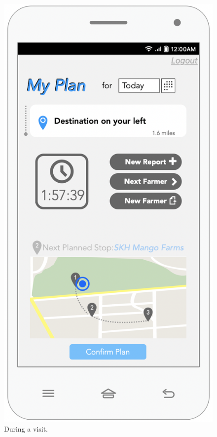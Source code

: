 \begin{multicols}{2}
\begin{figure}[H]
\centering
\includegraphics[scale=0.5]{../images_diagrams/mock_ups/dd/Plan05_AtFarm.png}
\caption{\label{fig:mockplan_visit}During a visit.}
\end{figure}


\end{multicols}
